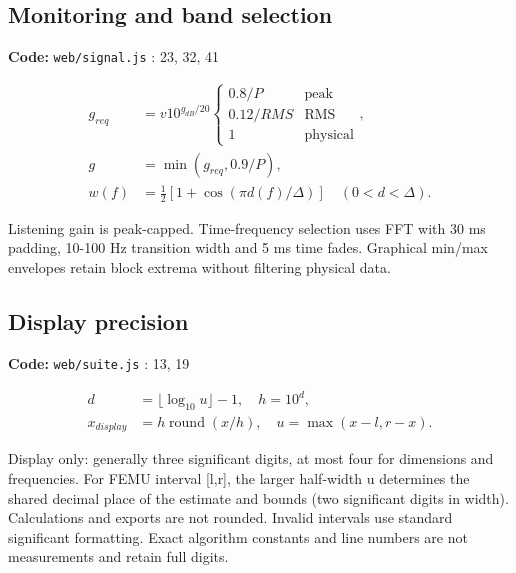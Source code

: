 \documentclass[10pt,a4paper]{article}
\newcommand{\loc}[1]{{\small\color{ink}\textbf{Code:} #1\par}}
\begin{document}
\begin{samepage}\subsection{Monitoring and band selection}
\loc{\texttt{web/signal.js} : 23, 32, 41}
\begin{align}g_{req}&=v10^{g_{dB}/20}\begin{cases}0.8/P&\text{peak}\\0.12/RMS&\text{RMS}\\1&\text{physical}\end{cases},\\
g&=\min(g_{req},0.9/P),\\
w(f)&=\tfrac12[1+\cos(\pi d(f)/\Delta)]\quad(0<d<\Delta).\end{align}

Listening gain is peak-capped. Time-frequency selection uses FFT with 30 ms padding, 10-100 Hz transition width and 5 ms time fades. Graphical min/max envelopes retain block extrema without filtering physical data.\par
\end{samepage}
\begin{samepage}\subsection{Display precision}
\loc{\texttt{web/suite.js} : 13, 19}
\begin{align}d&=\lfloor\log_{10}u\rfloor-1,\quad h=10^d,\\x_{display}&=h\operatorname{round}(x/h),\quad u=\max(x-l,r-x).\end{align}

Display only: generally three significant digits, at most four for dimensions and frequencies. For FEMU interval [l,r], the larger half-width u determines the shared decimal place of the estimate and bounds (two significant digits in width). Calculations and exports are not rounded. Invalid intervals use standard significant formatting. Exact algorithm constants and line numbers are not measurements and retain full digits.\par
\end{samepage}
\end{document}
